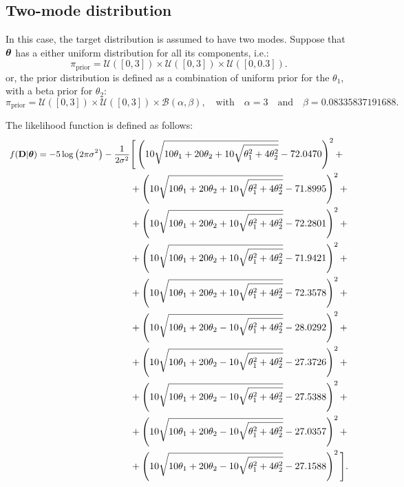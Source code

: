 \subsection{Two-mode distribution}

In this case, the target distribution is assumed to have two modes.
Suppose that $\mbox{\boldmath$ \theta $}$ has a either uniform distribution for all its components, i.e.:
$$
\pi_{\text{prior}}=\mathcal{U}([0,3]) \times \mathcal{U}([0,3]) \times \mathcal{U}([0,0.3]).
$$
or, the prior distribution is defined as a combination of uniform prior for the $\theta_1$, with a beta prior for $\theta_2$:
$$
\pi_{\text{prior}}=\mathcal{U}([0,3]) \times \mathcal{U}([0,3]) \times \mathcal{B}(\alpha,\beta), \quad \text{with} \quad \alpha=3 \quad\text{and}\quad \beta=0.08335837191688.
$$

The likelihood function is defined as follows:
\begin{equation}
\begin{split}\small
f({\bf D}|\mbox{\boldmath$ \theta $})=  -5 \log\left(2 \pi \sigma^2\right)- \dfrac{1}{2\sigma^2} &\Bigg[
  \left(10 \sqrt{10 \theta_1+20 \theta_2+10 \sqrt{\theta_1^2+4 \theta_2^2}}-72.0470\right)^2+\\
&+\left(10 \sqrt{10 \theta_1+20 \theta_2+10 \sqrt{\theta_1^2+4 \theta_2^2}}-71.8995\right)^2+\\
&+\left(10 \sqrt{10 \theta_1+20 \theta_2+10 \sqrt{\theta_1^2+4 \theta_2^2}}-72.2801\right)^2+\\
&+\left(10 \sqrt{10 \theta_1+20 \theta_2+10 \sqrt{\theta_1^2+4 \theta_2^2}}-71.9421\right)^2+\\
&+\left(10 \sqrt{10 \theta_1+20 \theta_2+10 \sqrt{\theta_1^2+4 \theta_2^2}}-72.3578\right)^2+\\
&+\left(10 \sqrt{10 \theta_1+20 \theta_2-10 \sqrt{\theta_1^2+4 \theta_2^2}}-28.0292\right)^2+\\
&+\left(10 \sqrt{10 \theta_1+20 \theta_2-10 \sqrt{\theta_1^2+4 \theta_2^2}}-27.3726\right)^2+\\
&+\left(10 \sqrt{10 \theta_1+20 \theta_2-10 \sqrt{\theta_1^2+4 \theta_2^2}}-27.5388\right)^2+\\
&+\left(10 \sqrt{10 \theta_1+20 \theta_2-10 \sqrt{\theta_1^2+4 \theta_2^2}}-27.0357\right)^2+\\
&+\left(10 \sqrt{10 \theta_1+20 \theta_2-10 \sqrt{\theta_1^2+4 \theta_2^2}}-27.1588\right)^2 \Bigg].
\end{split}
\end{equation}




